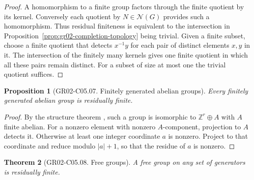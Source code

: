 \documentclass[11pt,oneside,openany]{book}
\newtheorem{theorem}{Theorem}[chapter]
\newtheorem{proposition}[theorem]{Proposition}
\theoremstyle{definition}
\theoremstyle{remark}
\begin{document}
\begin{proof}
A homomorphism to a finite group factors through the finite quotient
by its kernel. Conversely each quotient by \(N\in\mathcal N(G)\)
provides such a homomorphism. Thus residual finiteness is equivalent
to the intersection in Proposition~\ref{prop:gr02-completion-topology}
being trivial. Given a finite subset, choose a finite quotient
that detects \(x^{-1}y\) for each pair of distinct elements \(x,y\)
in it. The intersection of the finitely many kernels gives one
finite quotient in which all these pairs remain distinct.
For a subset of size at most one the trivial quotient suffices.
\end{proof}

\begin{proposition}[GR02-C05.07. Finitely generated abelian groups]
\label{prop:gr02-abelian-residual}
Every finitely generated abelian group is residually finite.
\end{proposition}

\begin{proof}
By the structure theorem \cite[K07.07.fg\_abelian\_extension]{d07},
such a group is isomorphic to \(\mathbb Z^r\oplus A\) with \(A\)
finite abelian. For a nonzero element with nonzero \(A\)-component,
projection to \(A\) detects it. Otherwise at least one integer
coordinate \(a\) is nonzero. Project to that coordinate and reduce
modulo \(|a|+1\), so that the residue of \(a\) is nonzero.
\end{proof}

\begin{theorem}[GR02-C05.08. Free groups]
\label{thm:gr02-free-residual}
A free group on any set of generators is residually finite.
\end{theorem}
\end{document}
